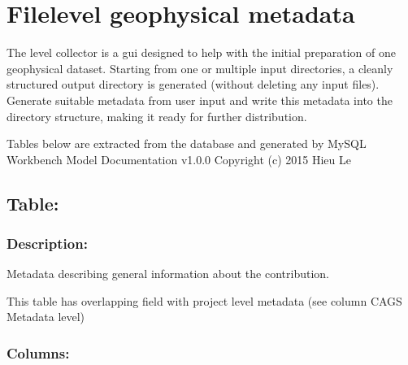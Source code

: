 \documentclass[letterpaper,10pt,english]{sphinxmanual}
\begin{document}
\section{File\sphinxhyphen{}level geophysical metadata}
\label{\detokenize{schema_documentation:file-level-geophysical-metadata}}
\sphinxAtStartPar
The  level collector is a gui designed to help with the initial preparation of one geophysical dataset. Starting from one or multiple input directories, a cleanly structured output directory is generated (without deleting any input files).
Generate suitable metadata from user input and write this metadata into the directory structure, making it ready for further distribution.

\sphinxAtStartPar
{}

\sphinxAtStartPar
Tables below are extracted from the database and generated by MySQL Workbench Model Documentation v1.0.0 \sphinxhyphen{} Copyright (c)
2015 Hieu Le


\subsection{Table: }
\label{\detokenize{schema_documentation:table-report}}

\subsubsection{Description:}
\label{\detokenize{schema_documentation:id11}}
\sphinxAtStartPar
Metadata describing general information about the contribution.

\sphinxAtStartPar
This table has overlapping field with project level metadata (see column
CAGS Metadata level)


\subsubsection{Columns:}
\label{\detokenize{schema_documentation:id12}}
\end{document}
